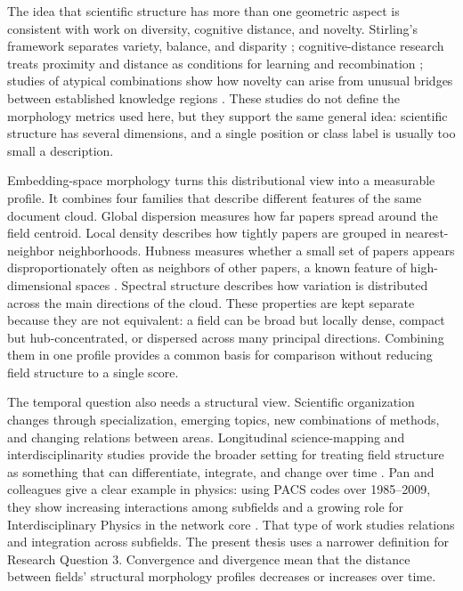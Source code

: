 The idea that scientific structure has more than one geometric aspect is consistent with work on diversity, cognitive distance, and novelty. Stirling's framework separates variety, balance, and disparity \parencite{stirling2007diversity}; cognitive-distance research treats proximity and distance as conditions for learning and recombination \parencite{nooteboom2007cognitive}; studies of atypical combinations show how novelty can arise from unusual bridges between established knowledge regions \parencite{uzzi2013atypical}. These studies do not define the morphology metrics used here, but they support the same general idea: scientific structure has several dimensions, and a single position or class label is usually too small a description.

Embedding-space morphology turns this distributional view into a measurable profile. It combines four families that describe different features of the same document cloud. Global dispersion measures how far papers spread around the field centroid. Local density describes how tightly papers are grouped in nearest-neighbor neighborhoods. Hubness measures whether a small set of papers appears disproportionately often as neighbors of other papers, a known feature of high-dimensional spaces \parencite{aggarwal2001surprising,radovanovic2010hubness}. Spectral structure describes how variation is distributed across the main directions of the cloud. These properties are kept separate because they are not equivalent: a field can be broad but locally dense, compact but hub-concentrated, or dispersed across many principal directions. Combining them in one profile provides a common basis for comparison without reducing field structure to a single score.

The temporal question also needs a structural view. Scientific organization changes through specialization, emerging topics, new combinations of methods, and changing relations between areas. Longitudinal science-mapping and interdisciplinarity studies provide the broader setting for treating field structure as something that can differentiate, integrate, and change over time \parencite{vanraan2000growth,porter2009interdisciplinary,rafols2010networkcoherence,leydesdorff2011indicators}. Pan and colleagues give a clear example in physics: using PACS codes over 1985--2009, they show increasing interactions among subfields and a growing role for Interdisciplinary Physics in the network core \parencite{pan2012interdisciplinarity}. That type of work studies relations and integration across subfields. The present thesis uses a narrower definition for Research Question 3. Convergence and divergence mean that the distance between fields' structural morphology profiles decreases or increases over time.

